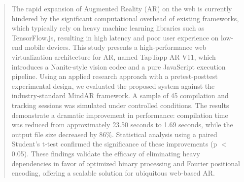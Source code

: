 \begin{abstract}
The rapid expansion of Augmented Reality (AR) on the web is currently hindered by the significant computational overhead of existing frameworks, which typically rely on heavy machine learning libraries such as TensorFlow.js, resulting in high latency and poor user experience on low-end mobile devices. This study presents a high-performance web virtualization architecture for AR, named TapTapp AR V11, which introduces a Nanite-style vision codec and a pure JavaScript execution pipeline. Using an applied research approach with a pretest-posttest experimental design, we evaluated the proposed system against the industry-standard MindAR framework. A sample of 45 compilation and tracking sessions was simulated under controlled conditions. The results demonstrate a dramatic improvement in performance: compilation time was reduced from approximately 23.50 seconds to 1.69 seconds, while the output file size decreased by 86\%. Statistical analysis using a paired Student's t-test confirmed the significance of these improvements (p $<$ 0.05). These findings validate the efficacy of eliminating heavy dependencies in favor of optimized binary processing and Fourier positional encoding, offering a scalable solution for ubiquitous web-based AR.
\end{abstract}
